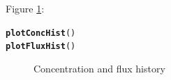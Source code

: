\documentclass[a4paper,11pt]{article}\usepackage[]{graphicx}\usepackage[]{color}
\makeatletter
\newcommand{\hlstd}[1]{\textcolor[rgb]{0.345,0.345,0.345}{#1}}%
\newcommand{\hlkwd}[1]{\textcolor[rgb]{0.737,0.353,0.396}{\textbf{#1}}}%
\newenvironment{kframe}{%
 \def\at@end@of@kframe{}%
 \ifinner\ifhmode%
  \def\at@end@of@kframe{\end{minipage}}%
  \begin{minipage}{\columnwidth}%
 \fi\fi%
 \def\FrameCommand##1{\hskip\@totalleftmargin \hskip-\fboxsep
 \colorbox{shadecolor}{##1}\hskip-\fboxsep
     \hskip-\linewidth \hskip-\@totalleftmargin \hskip\columnwidth}%
 \MakeFramed {\advance\hsize-\width
   \@totalleftmargin\z@ \linewidth\hsize
   \@setminipage}}%
 {\par\unskip\endMakeFramed%
 \at@end@of@kframe}
\newenvironment{knitrout}{}{} %
\makeatother
\begin{document}
Figure \ref{fig:plotFluxHist}:
\begin{knitrout}
\color{fgcolor}\begin{kframe}
\begin{alltt}
\hlkwd{plotConcHist}\hlstd{()}
\hlkwd{plotFluxHist}\hlstd{()}
\end{alltt}
\end{kframe}\begin{figure}[]
\caption[Concentration and flux history]{Concentration and flux history\label{fig:plotFluxHist}}
\end{figure}


\end{knitrout}
\end{document}
